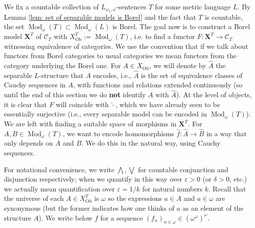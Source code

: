 \documentclass[12pt]{amsart}
\DeclareMathOperator{\Mod}{Mod}
\DeclareMathOperator{\Ob}{Ob}
\newcommand{\theory}{T}
\begin{document}
We fix a countable collection of $L_{\omega_1,\omega}$-sentences $\theory$ for some metric language $L$.
By Lemma \ref{lem: set of separable models is Borel} and the fact that $T$ is countable, the set $\Mod_\omega(\theory) \subset \Mod_\omega(L)$ is Borel.
The goal now is to construct a Borel model $\mathbf{X}^{\theory}$ of $\mathcal{C}_{\theory}$  with $X^{\theory}_{\Ob}:=\Mod_\omega(\theory)$, i.e. to find a functor $F \colon \mathbf{X}^{\theory} \to\mathcal{C}_{\theory}$ witnessing equivalence of categories. We use the convention that if we talk about functors from Borel categories to usual categories we mean functors from the category underlying the Borel one.
For $A\in X_{\Ob}$, we will denote by $\widehat{A}$ the separable $L$-structure that $A$ encodes, i.e., $\widehat{A}$ is the set of equivalence classes of Cauchy sequences in $A$, with functions and relations extended continuously (so until the end of this section we do \textbf{not} identify $A$ with $\widehat{A}$).
At the level of objects, it is clear that $F$ will coincide with $\widehat{\cdot}$, which we have already seen to be essentially surjective (i.e., every separable model can be encoded in $\Mod_\omega(\theory)$). 
We are left with finding a suitable space of morphisms in $\mathbf{X}^{\theory}$. For $A,B\in \Mod_\omega(\theory)$, we want to encode homomorphisms $\widehat{f} \colon \widehat{A}\to\widehat{B}$ in a way that only depends on $A$ and $B$. We do this in the natural way, using Cauchy sequences.

For notational convenience, we write $\bigwedge, \bigvee$ for countable conjunction and disjunction respectively; when we quantify in this way over $\varepsilon>0$ (or $\delta>0$, etc.) we actually mean quantification over $\varepsilon = 1/k$ for natural numbers $k$. Recall that the universe of each $A\in X^{\theory}_{\Ob}$ is $\omega$ so the expressions $a\in A$ and $a\in\omega$ are synonymous (but the former indicates how one thinks of $a$ as an element of the structure $A$). We write below $f$ for a sequence $(f_n)_{n\in\omega}\in (\omega^\omega)^\omega$.
\end{document}
